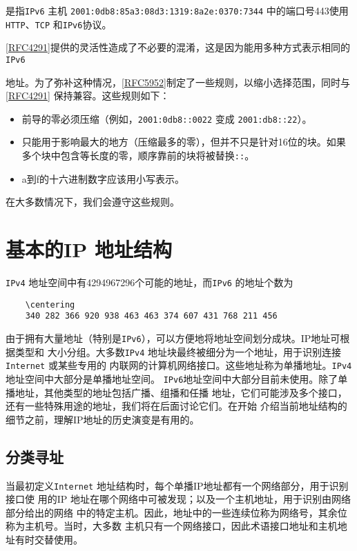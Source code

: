 是指\verb|IPv6| 主机 \verb|2001:0db8:85a3:08d3:1319:8a2e:0370:7344| 中的端口号443使用\verb|HTTP|、\verb|TCP|
和\verb|IPv6|协议。

\href{https://www.rfc-editor.org/rfc/rfc4291}{[RFC4291]}提供的灵活性造成了不必要的混淆，这是因为能用多种方式表示相同的\verb|IPv6|

地址。为了弥补这种情况，\href{https://www.rfc-editor.org/rfc/rfc5952}{[RFC5952]}制定了一些规则，以缩小选择范围，同时与\href{https://www.rfc-editor.org/rfc/rfc4291}{[RFC4291]}
保持兼容。这些规则如下：

\begin{itemize}
    \item 前导的零必须压缩（例如，\verb|2001:0db8::0022| 变成 \verb|2001:db8::22|）。
    \item 只能用于影响最大的地方（压缩最多的零），但并不只是针对16位的块。如果多个块中包含等长度的零，顺序靠前的块将被替换\verb|::|。
    \item a到f的十六进制数字应该用小写表示。
\end{itemize}

在大多数情况下，我们会遵守这些规则。

\section{基本的IP 地址结构}
\verb|IPv4| 地址空间中有4294967296个可能的地址，而\verb|IPv6| 的地址个数为

\begin{verbatim}
    \centering
    340 282 366 920 938 463 463 374 607 431 768 211 456
\end{verbatim}

由于拥有大量地址（特别是\verb|IPv6|），可以方便地将地址空间划分成块。IP地址可根据类型和
大小分组。大多数\verb|IPv4| 地址块最终被细分为一个地址，用于识别连接 \verb|Internet| 或某些专用的
内联网的计算机网络接口。这些地址称为单播地址。\verb|IPv4|地址空间中大部分是单播地址空间。
\verb|IPv6|地址空间中大部分目前未使用。除了单播地址，其他类型的地址包括广播、组播和任播
地址，它们可能涉及多个接口，还有一些特殊用途的地址，我们将在后面讨论它们。在开始
介绍当前地址结构的细节之前，理解IP地址的历史演变是有用的。

\subsection{分类寻址}
当最初定义\verb|Internet| 地址结构时，每个单播IP地址都有一个网络部分，用于识别接口使
用的IP 地址在哪个网络中可被发现；以及一个主机地址，用于识别由网络部分给出的网络
中的特定主机。因此，地址中的一些连续位称为网络号，其余位称为主机号。当时，大多数
主机只有一个网络接口，因此术语接口地址和主机地址有时交替使用。

